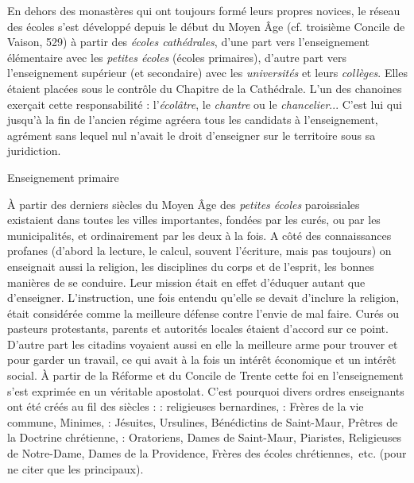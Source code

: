 En dehors des monastères qui ont toujours formé leurs propres novices, le réseau des écoles s'est développé depuis le début du Moyen Âge (cf. troisième Concile de Vaison, 529) à partir des \emph{écoles cathédrales}, d'une part vers l'enseignement élémentaire avec les \emph{petites écoles} (écoles primaires), d'autre part vers l'enseignement supérieur (et secondaire) avec les \emph{universités} et leurs \emph{collèges}.  Elles étaient placées sous le contrôle du Chapitre de la Cathédrale. L'un des chanoines exerçait cette responsabilité : l'\emph{écolâtre},  le \emph{chantre} ou le \emph{chancelier}... C'est lui qui jusqu'à la fin de l'ancien régime agréera tous les candidats à l'enseignement, agrément sans lequel nul n'avait le droit d'enseigner sur le territoire sous sa juridiction.

Enseignement primaire

À partir des derniers siècles du Moyen Âge des \emph{petites écoles} paroissiales existaient dans toutes les villes importantes, fondées par les curés, ou par les municipalités, et ordinairement par les deux à la fois. A côté des connaissances profanes (d'abord la lecture, le calcul, souvent l'écriture, mais pas toujours) on enseignait aussi la religion, les disciplines du corps et de l'esprit, les bonnes manières de se conduire. Leur mission était en effet d'éduquer autant que d'enseigner. L'instruction, une fois entendu qu'elle se devait d'inclure la religion, était considérée comme la meilleure défense contre l'envie de mal faire. Curés ou pasteurs protestants, parents et autorités locales étaient d'accord sur ce point. D'autre part les citadins voyaient aussi en elle la meilleure arme pour trouver et pour garder un travail, ce qui avait à la fois un intérêt économique et un intérêt social. À partir de la Réforme et du Concile de Trente cette foi en l'enseignement s'est exprimée en un véritable apostolat. C'est pourquoi divers ordres enseignants ont été créés au fil des siècles :
 : religieuses bernardines,
 : Frères de la vie commune, Minimes,
 : Jésuites, Ursulines, Bénédictins de Saint-Maur, Prêtres de la Doctrine chrétienne,
 : Oratoriens, Dames de Saint-Maur, Piaristes, Religieuses de Notre-Dame, Dames de la Providence, Frères des écoles chrétiennes,~etc. (pour ne citer que les principaux).

